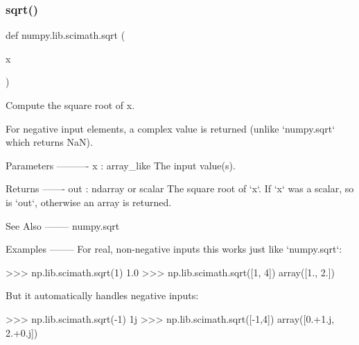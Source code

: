 \subsubsection{\texorpdfstring{sqrt()}{sqrt()}}
{\footnotesize\ttfamily def numpy.\+lib.\+scimath.\+sqrt (\begin{DoxyParamCaption}\item[{}]{x }\end{DoxyParamCaption})}

\begin{DoxyVerb}Compute the square root of x.

For negative input elements, a complex value is returned
(unlike `numpy.sqrt` which returns NaN).

Parameters
----------
x : array_like
   The input value(s).

Returns
-------
out : ndarray or scalar
   The square root of `x`. If `x` was a scalar, so is `out`,
   otherwise an array is returned.

See Also
--------
numpy.sqrt

Examples
--------
For real, non-negative inputs this works just like `numpy.sqrt`:

>>> np.lib.scimath.sqrt(1)
1.0
>>> np.lib.scimath.sqrt([1, 4])
array([1.,  2.])

But it automatically handles negative inputs:

>>> np.lib.scimath.sqrt(-1)
1j
>>> np.lib.scimath.sqrt([-1,4])
array([0.+1.j, 2.+0.j])\end{DoxyVerb}
 